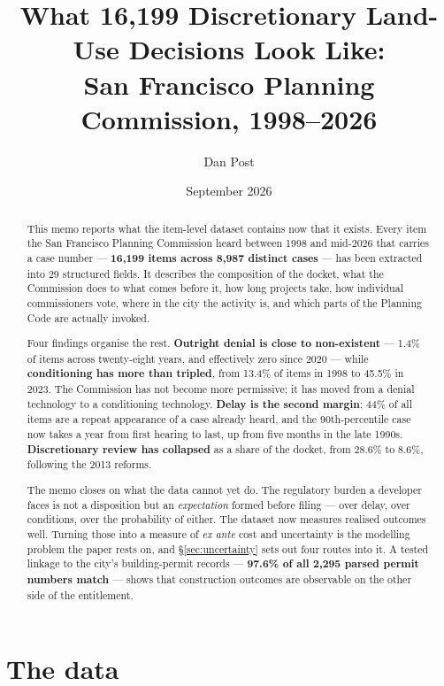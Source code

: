 \documentclass[11pt]{article}
\title{What 16{,}199 Discretionary Land-Use Decisions Look Like:\\
\large San Francisco Planning Commission, 1998--2026}
\author{Dan Post}
\date{September 2026}
\begin{document}
\maketitle

\begin{abstract}
\noindent
This memo reports what the item-level dataset contains now that it exists. Every item the San
Francisco Planning Commission heard between 1998 and mid-2026 that carries a case number ---
\textbf{16{,}199 items across 8{,}987 distinct cases} --- has been extracted into 29 structured
fields. It describes the composition of the docket, what the Commission does to what comes
before it, how long projects take, how individual commissioners vote, where in the city the
activity is, and which parts of the Planning Code are actually invoked.

\medskip\noindent
Four findings organise the rest. \textbf{Outright denial is close to non-existent} --- 1.4\%
of items across twenty-eight years, and effectively zero since 2020 --- while
\textbf{conditioning has more than tripled}, from 13.4\% of items in 1998 to 45.5\% in 2023.
The Commission has not become more permissive; it has moved from a denial technology to a
conditioning technology. \textbf{Delay is the second margin}: 44\% of all items are a repeat
appearance of a case already heard, and the 90th-percentile case now takes a year from first
hearing to last, up from five months in the late 1990s. \textbf{Discretionary review has
collapsed} as a share of the docket, from 28.6\% to 8.6\%, following the 2013 reforms.

\medskip\noindent
The memo closes on what the data cannot yet do. The regulatory burden a developer faces is
not a disposition but an \emph{expectation} formed before filing --- over delay, over
conditions, over the probability of either. The dataset now measures realised outcomes well.
Turning those into a measure of \emph{ex ante} cost and uncertainty is the modelling problem
the paper rests on, and \S\ref{sec:uncertainty} sets out four routes into it. A tested
linkage to the city's building-permit records --- \textbf{97.6\% of all 2{,}295 parsed permit
numbers match} --- shows that construction outcomes are observable on the other side of the
entitlement.
\end{abstract}

\tableofcontents
\newpage

\section{The data}
\end{document}
